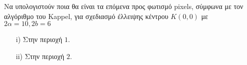 \begin{exercise}
	Να υπολογιστούν ποια θα είναι τα επόμενα προς φωτισμό pixels, σύμφωνα με τον αλγόριθμο του Kappel, για σχεδιασμό έλλειψης κέντρου $K(0,0)$ με $2\alpha = 10, 2b =6$ 
\begin{enumerate}
  \item[i)] Στην περιοχή $1$.
  \item[ii)] Στην περιοχή $2$.  
\end{enumerate}
		
\end{exercise}
